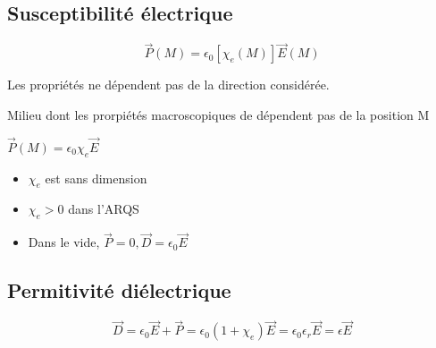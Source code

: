 \documentclass[french]{yLectureNote}
\renewcommand{\vec}{\overrightarrow}
\begin{document}
\subsection{Susceptibilité électrique}
\begin{definition}
    $$\vec{P}(M) = \epsilon_0 [\chi_e(M)]\vec{E}(M)$$
\end{definition}
\begin{definition}[Isotrope]
    Les propriétés ne dépendent pas de la direction considérée. 
\end{definition}
\begin{definition}
    Milieu dont les prorpiétés macroscopiques de dépendent pas de la position M
\end{definition}
\begin{theorem}
    $\vec{P}(M) = \epsilon_0 \chi_e\vec{E}$
\end{theorem}
\begin{itemize}
    \item $\chi_e$ est sans dimension
    \item $\chi_e>0$ dans l'ARQS 
    \item Dans le vide, $\vec{P} = 0, \vec{D} = \epsilon_0\vec{E}$
\end{itemize}
\subsection{Permitivité diélectrique}
\begin{theorem}
    $$\vec{D} = \epsilon_0 \vec{E} + \vec{P} = \epsilon_0 (1+\chi_e)\vec{E} = \epsilon_0\epsilon_r \vec{E} = \epsilon \vec{E}$$
\end{theorem}
\end{document}
